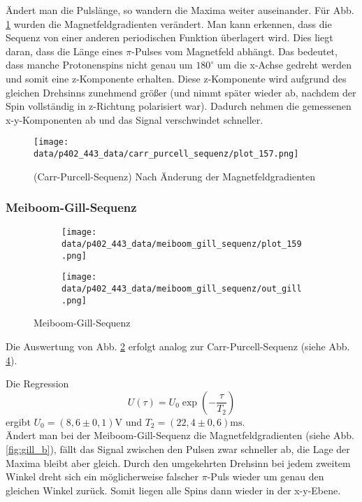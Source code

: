 Ändert man die Pulslänge, so wandern die Maxima weiter auseinander. Für Abb. \ref{fig:carr_b} wurden die Magnetfeldgradienten verändert. Man kann erkennen, dass die Sequenz von einer anderen periodischen Funktion überlagert wird. Dies liegt daran, dass die Länge eines $\pi$-Pulses vom Magnetfeld abhängt. Das bedeutet, dass manche Protonenspins nicht genau um $180^\circ$ um die x-Achse gedreht werden und somit eine z-Komponente erhalten. Diese z-Komponente wird aufgrund des gleichen Drehsinns zunehmend größer (und nimmt später wieder ab, nachdem der Spin vollständig in z-Richtung polarisiert war). Dadurch nehmen die gemessenen x-y-Komponenten ab und das Signal verschwindet schneller.
 
\begin{figure}[h]
\centering
\texttt{[image: data/p402\_443\_data/carr\_purcell\_sequenz/plot\_157.png]}
\caption{(Carr-Purcell-Sequenz) Nach Änderung der Magnetfeldgradienten}
\label{fig:carr_b}
\end{figure}
\newpage

\subsubsection{Meiboom-Gill-Sequenz}

\begin{figure}[h]
  \begin{subfigure}[h]{0.5\textwidth}
    \centering
    \texttt{[image: data/p402\_443\_data/meiboom\_gill\_sequenz/plot\_159.png]}
    \label{fig:gill_raw}
  \end{subfigure}%
  \begin{subfigure}[h]{0.5\textwidth}
    \centering
    \texttt{[image: data/p402\_443\_data/meiboom\_gill\_sequenz/out\_gill.png]}
    \label{fig:gill}
  \end{subfigure}
  \caption{Meiboom-Gill-Sequenz}
\end{figure}
Die Auswertung von Abb. \ref{fig:gill_raw} erfolgt analog zur Carr-Purcell-Sequenz (siehe Abb. \ref{fig:gill}).

Die Regression $$U(\tau) = U_0\exp{\left(-\frac{\tau}{T_2}\right)}$$ ergibt $U_0 = (8,6\pm 0,1)\si{\volt}$ und $T_2 = (22,4\pm 0,6) \si{\milli\second}$.\\

Ändert man bei der Meiboom-Gill-Sequenz die Magnetfeldgradienten (siehe Abb. \ref{fig:gill_b}), fällt das Signal zwischen den Pulsen zwar schneller ab, die Lage der Maxima bleibt aber gleich. Durch den umgekehrten Drehsinn bei jedem zweitem Winkel dreht sich ein möglicherweise falscher $\pi$-Puls wieder um genau den gleichen Winkel zurück. Somit liegen alle Spins dann wieder in der x-y-Ebene.\\
  
